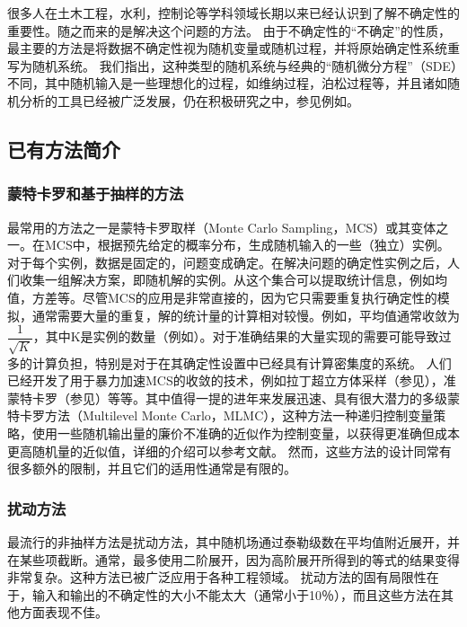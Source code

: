很多人在土木工程，水利，控制论等学科领域长期以来已经认识到了解不确定性的重要性。随之而来的是解决这个问题的方法。 由于不确定性的“不确定”的性质，最主要的方法是将数据不确定性视为随机变量或随机过程，并将原始确定性系统重写为随机系统。
我们指出，这种类型的随机系统与经典的“随机微分方程”（SDE）不同，其中随机输入是一些理想化的过程，如维纳过程，泊松过程等，并且诸如随机分析的工具已经被广泛发展，仍在积极研究之中，参见例如。
\subsection{已有方法简介}

\subsubsection{蒙特卡罗和基于抽样的方法}

最常用的方法之一是蒙特卡罗取样（Monte Carlo Sampling，MCS）或其变体之一。在MCS中，根据预先给定的概率分布，生成随机输入的一些（独立）实例。对于每个实例，数据是固定的，问题变成确定。在解决问题的确定性实例之后，人们收集一组解决方案，即随机解的实例。从这个集合可以提取统计信息，例如均值，方差等。尽管MCS的应用是非常直接的，因为它只需要重复执行确定性的模拟，通常需要大量的重复，解的统计量的计算相对较慢。例如，平均值通常收敛为$\dfrac{1}{\sqrt K}$，其中K是实例的数量（例如）。对于准确结果的大量实现的需要可能导致过多的计算负担，特别是对于在其确定性设置中已经具有计算密集度的系统。
人们已经开发了用于暴力加速MCS的收敛的技术，例如拉丁超立方体采样（参见），准蒙特卡罗（参见）等等。其中值得一提的进年来发展迅速、具有很大潜力的多级蒙特卡罗方法（Multilevel Monte Carlo，MLMC），这种方法一种递归控制变量策略，使用一些随机输出量的廉价不准确的近似作为控制变量，以获得更准确但成本更高随机量的近似值，详细的介绍可以参考文献。
然而，这些方法的设计同常有很多额外的限制，并且它们的适用性通常是有限的。

\subsubsection{扰动方法}

最流行的非抽样方法是扰动方法，其中随机场通过泰勒级数在平均值附近展开，并在某些项截断。通常，最多使用二阶展开，因为高阶展开所得到的等式的结果变得非常复杂。这种方法已被广泛应用于各种工程领域。 扰动方法的固有局限性在于，输入和输出的不确定性的大小不能太大（通常小于10％），而且这些方法在其他方面表现不佳。

